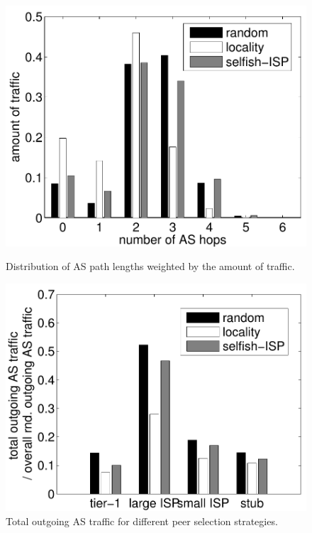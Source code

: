\begin{figure}[bt]
\begin{minipage}[t]{0.49\textwidth}
	\centering
	\includegraphics[width=\textwidth]{aslevel/p2p/results/figs/hops}
 	\caption{Distribution of AS path lengths weighted by the amount of traffic.}
 	\label{fig:CDF_hops}
\end{minipage}
\hspace{0.01\textwidth}
\begin{minipage}[t]{0.49\textwidth}
	\centering
	\includegraphics[width=\textwidth]{aslevel/p2p/results/figs/outgoing}
 	\caption{Total outgoing AS traffic for different peer selection strategies.}
 	\label{fig:outgoing}
\end{minipage}
\end{figure}

